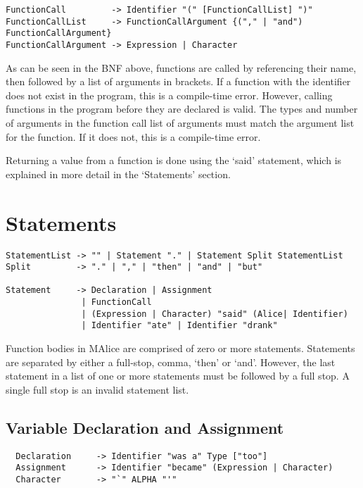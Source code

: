 \documentclass[a4wide, 11pt]{article}
\begin{document}
\begin{verbatim}
FunctionCall         -> Identifier "(" [FunctionCallList] ")"
FunctionCallList     -> FunctionCallArgument {("," | "and") FunctionCallArgument}
FunctionCallArgument -> Expression | Character
\end{verbatim}

As can be seen in the BNF above, functions are called by referencing their name, then followed by a list of arguments in brackets. If a function with the identifier does not exist in the program, this is a compile-time error. However, calling functions in the program before they are declared is valid. The types and number of arguments in the function call list of arguments must match the argument list for the function. If it does not, this is a compile-time error.

Returning a value from a function is done using the `said' statement, which is explained in more detail in the `Statements' section.

\section{Statements}

\begin{verbatim}
StatementList -> "" | Statement "." | Statement Split StatementList
Split         -> "." | "," | "then" | "and" | "but"

Statement     -> Declaration | Assignment
               | FunctionCall
               | (Expression | Character) "said" (Alice| Identifier)
               | Identifier "ate" | Identifier "drank"
\end{verbatim}

Function bodies in MAlice are comprised of zero or more statements. Statements are separated by either a full-stop, comma, `then' or `and'. However, the last statement in a list of one or more statements must be followed by a full stop. A single full stop is an invalid statement list.

\subsection{Variable Declaration and Assignment}

\begin{verbatim}
  Declaration     -> Identifier "was a" Type ["too"]
  Assignment      -> Identifier "became" (Expression | Character)
  Character       -> "`" ALPHA "'"
\end{verbatim}
\end{document}
